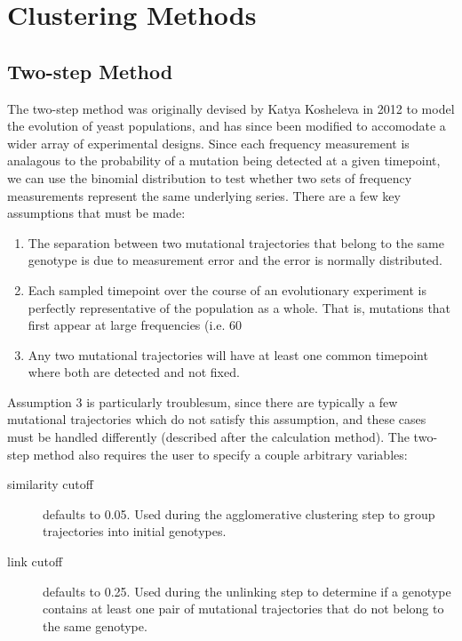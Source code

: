 \documentclass{report}
\begin{document}
\chapter{Clustering Methods}

\section{Two-step Method}
The two-step method was originally devised by Katya Kosheleva in 2012 to model the evolution of yeast populations, and has since been modified to accomodate a wider array of experimental designs. Since each frequency measurement is analagous to the probability of a mutation being detected at a given timepoint, we can use the binomial distribution to test whether two sets of frequency measurements represent the same underlying series. There are a few key assumptions that must be made:

\begin{enumerate}
\item The separation between two mutational trajectories that belong to the same genotype is due to measurement error and the error is normally distributed.
\item Each sampled timepoint over the course of an evolutionary experiment is perfectly representative of the population as a whole. That is, mutations that first appear at large frequencies (i.e. 60%
\item Any two mutational trajectories will have at least one common timepoint where both are detected and not fixed.
\end{enumerate}

Assumption 3 is particularly troublesum, since there are typically a few mutational trajectories which do not satisfy this assumption, and these cases must be handled differently (described after the calculation method).
The two-step method also requires the user to specify a couple arbitrary variables:

\begin{description}
\item[similarity cutoff] defaults to 0.05. Used during the agglomerative clustering step to group trajectories into initial genotypes.
\item[link cutoff] defaults to 0.25. Used during the unlinking step to determine if a genotype contains at least one pair of mutational trajectories that do not belong to the same genotype.
\end{description}
\end{document}
